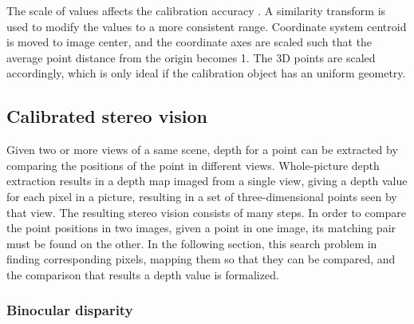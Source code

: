 

The scale of values affects the calibration accuracy \cite{hartley1997defense,hartley03multiview}.
A similarity transform is used to modify the values to a more consistent range.
Coordinate system centroid is moved to image center, and the coordinate axes are scaled such that the average point distance from the origin becomes 1.
The 3D points are scaled accordingly, which is only ideal if the calibration object has an uniform geometry. \cite{hartley03multiview}


\subsection{Calibrated stereo vision} %

Given two or more views of a same scene, depth for a point can be extracted by comparing the positions of the point in different views.
Whole-picture depth extraction results in a depth map imaged from a single view, giving a depth value for each pixel in a picture, resulting in a set of three-dimensional points seen by that view.
The resulting stereo vision consists of many steps.
In order to compare the point positions in two images, given a point in one image, its matching pair must be found on the other.
In the following section, this search problem in finding corresponding pixels, mapping them so that they can be compared, and the comparison that results a depth value is formalized.


\subsubsection{Binocular disparity} \label{sec:binocular} %


